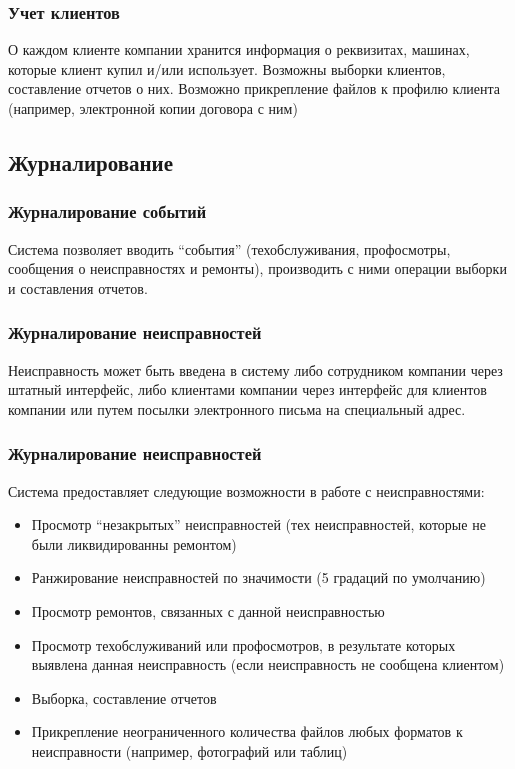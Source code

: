 \documentclass{beamer}
\begin{document}
\begin{frame}
\frametitle{Учет клиентов}
	О каждом клиенте компании хранится информация о реквизитах, машинах, которые
	клиент купил и/или использует. Возможны выборки клиентов, составление отчетов
	о них.
	Возможно прикрепление файлов к профилю клиента (например, электронной копии
	договора с ним)
\end{frame}

\subsection{Журналирование}
\begin{frame}
\frametitle{Журналирование событий}
	Система позволяет вводить ``события'' (техобслуживания, профосмотры, сообщения
	о неисправностях и ремонты), производить с ними операции выборки и составления
	отчетов.
\end{frame}

\begin{frame}
\frametitle{Журналирование неисправностей}
	Неисправность может быть введена в систему либо сотрудником компании через
	штатный интерфейс, либо клиентами компании через интерфейс для клиентов
	компании или путем посылки электронного письма на специальный адрес.

\end{frame}

\begin{frame}
\frametitle{Журналирование неисправностей}

	Система предоставляет следующие возможности в работе с неисправностями:
	\begin{itemize}
	  \item Просмотр ``незакрытых'' неисправностей (тех неисправностей, которые не
	  были ликвидированны ремонтом)
	  \item Ранжирование неисправностей по значимости (5 градаций по умолчанию)
	  \item Просмотр ремонтов, связанных с данной неисправностью
	  \item Просмотр техобслуживаний или профосмотров, в результате которых
	  выявлена данная неисправность (если неисправность не сообщена клиентом)
	  \item Выборка, составление отчетов
	  \item Прикрепление неограниченного количества файлов любых форматов к
	  неисправности (например, фотографий или таблиц)
	\end{itemize}
\end{frame}
\end{document}
